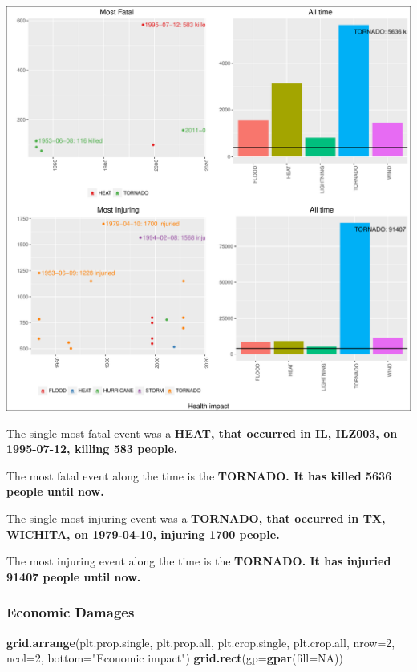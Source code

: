 \documentclass[]{article}
\newenvironment{Shaded}{\begin{snugshade}}{\end{snugshade}}
\newcommand{\KeywordTok}[1]{\textcolor[rgb]{0.13,0.29,0.53}{\textbf{{#1}}}}
\newcommand{\DataTypeTok}[1]{\textcolor[rgb]{0.13,0.29,0.53}{{#1}}}
\newcommand{\DecValTok}[1]{\textcolor[rgb]{0.00,0.00,0.81}{{#1}}}
\newcommand{\StringTok}[1]{\textcolor[rgb]{0.31,0.60,0.02}{{#1}}}
\newcommand{\OtherTok}[1]{\textcolor[rgb]{0.56,0.35,0.01}{{#1}}}
\newcommand{\NormalTok}[1]{{#1}}
\begin{document}
\includegraphics{readme_files/figure-latex/health-plot-1.pdf}

The single most fatal event was a \textbf{HEAT, that occurred in IL,
ILZ003, on 1995-07-12, killing 583 people.}

The most fatal event along the time is the \textbf{TORNADO. It has
killed 5636 people until now.}

The single most injuring event was a \textbf{TORNADO, that occurred in
TX, WICHITA, on 1979-04-10, injuring 1700 people.}

The most injuring event along the time is the \textbf{TORNADO. It has
injuried 91407 people until now.}

\subsubsection{Economic Damages}\label{economic-damages}

\begin{Shaded}
\begin{Highlighting}[]
\KeywordTok{grid.arrange}\NormalTok{(plt.prop.single, plt.prop.all,}
             \NormalTok{plt.crop.single, plt.crop.all,}
             \DataTypeTok{nrow=}\DecValTok{2}\NormalTok{, }\DataTypeTok{ncol=}\DecValTok{2}\NormalTok{,}
             \DataTypeTok{bottom=}\StringTok{"Economic impact"}\NormalTok{)}
\KeywordTok{grid.rect}\NormalTok{(}\DataTypeTok{gp=}\KeywordTok{gpar}\NormalTok{(}\DataTypeTok{fill=}\OtherTok{NA}\NormalTok{))}
\end{Highlighting}
\end{Shaded}
\end{document}
